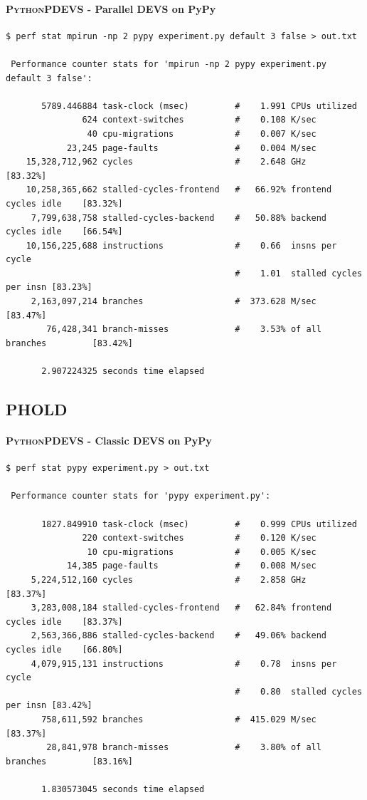 \documentclass[8pt,a4paper]{report}
\begin{document}
\paragraph{\textsc{PythonPDEVS} - Parallel DEVS on PyPy}
\begin{Verbatim}[fontsize=\small]
$ perf stat mpirun -np 2 pypy experiment.py default 3 false > out.txt

 Performance counter stats for 'mpirun -np 2 pypy experiment.py default 3 false':

       5789.446884 task-clock (msec)         #    1.991 CPUs utilized          
               624 context-switches          #    0.108 K/sec                  
                40 cpu-migrations            #    0.007 K/sec                  
            23,245 page-faults               #    0.004 M/sec                  
    15,328,712,962 cycles                    #    2.648 GHz                     [83.32%]
    10,258,365,662 stalled-cycles-frontend   #   66.92% frontend cycles idle    [83.32%]
     7,799,638,758 stalled-cycles-backend    #   50.88% backend  cycles idle    [66.54%]
    10,156,225,688 instructions              #    0.66  insns per cycle        
                                             #    1.01  stalled cycles per insn [83.23%]
     2,163,097,214 branches                  #  373.628 M/sec                   [83.47%]
        76,428,341 branch-misses             #    3.53% of all branches         [83.42%]

       2.907224325 seconds time elapsed
\end{Verbatim}
\subsection{PHOLD}
\paragraph{\textsc{PythonPDEVS} - Classic DEVS on PyPy}
\begin{Verbatim}[fontsize=\small]
$ perf stat pypy experiment.py > out.txt

 Performance counter stats for 'pypy experiment.py':

       1827.849910 task-clock (msec)         #    0.999 CPUs utilized          
               220 context-switches          #    0.120 K/sec                  
                10 cpu-migrations            #    0.005 K/sec                  
            14,385 page-faults               #    0.008 M/sec                  
     5,224,512,160 cycles                    #    2.858 GHz                     [83.37%]
     3,283,008,184 stalled-cycles-frontend   #   62.84% frontend cycles idle    [83.37%]
     2,563,366,886 stalled-cycles-backend    #   49.06% backend  cycles idle    [66.80%]
     4,079,915,131 instructions              #    0.78  insns per cycle        
                                             #    0.80  stalled cycles per insn [83.42%]
       758,611,592 branches                  #  415.029 M/sec                   [83.37%]
        28,841,978 branch-misses             #    3.80% of all branches         [83.16%]

       1.830573045 seconds time elapsed
\end{Verbatim}
\end{document}
